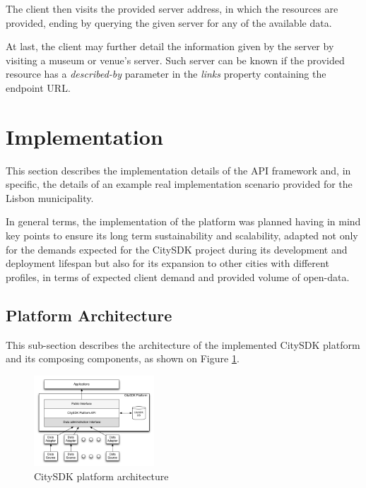 \documentclass[times]{ettauth}
\begin{document}
The client then visits the provided server address, in which the resources are provided, ending by querying the given server for any of the available data. 

At last, the client may further detail the information given by the server by visiting a museum or venue's server. Such server can be known if the provided resource has a \textit{described-by} parameter in the \textit{links} property containing the endpoint URL.

\section{Implementation}
\label{s:implementation}
This section describes the implementation details of the API framework and, in specific, the details of an example real implementation scenario provided for the Lisbon municipality. 

In general terms, the implementation of the platform was planned having in mind key points to ensure its long term sustainability and scalability, adapted not only for the demands expected for the CitySDK project during its development and deployment lifespan but also for its expansion to other cities with different profiles, in terms of expected client demand and provided volume of open-data.

\subsection{Platform Architecture}
This sub-section describes the architecture of the implemented CitySDK platform and its composing components, as shown on Figure \ref{fig:architecture}. 

\begin{figure}[!ht]
\centering
\includegraphics[width=0.4\textwidth]{images/architecture}
\caption{CitySDK platform architecture}
\label{fig:architecture}
\end{figure}
\end{document}
